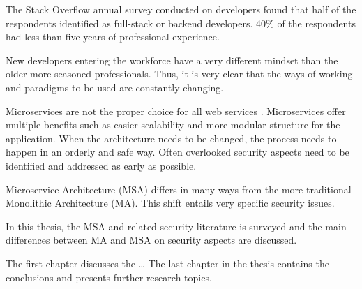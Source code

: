 \begin{sloppypar}
    The Stack Overflow annual survey \citep{sosurvey2019} conducted on 
    developers found that half of the respondents identified as full-stack or 
    backend developers. 40\% of the respondents had less than five years of 
    professional experience.
\end{sloppypar}
\begin{sloppypar}
    New developers entering the workforce have a very different mindset than 
    the older more seasoned professionals. Thus, it is very clear that the ways 
    of working and paradigms to be used are constantly changing.
\end{sloppypar}
\begin{sloppypar}
     Microservices are not the proper choice for all web services 
     \citep{newman2019}. Microservices offer multiple benefits such as easier 
     scalability and more modular structure for the application. When the 
     architecture needs to be changed, the process needs to happen in an orderly 
     and safe way. Often overlooked security aspects need to be identified and 
     addressed as early as possible.
\end{sloppypar}
\begin{sloppypar}
    Microservice Architecture (MSA) differs in many ways from 
    the more traditional Monolithic Architecture (MA). This shift entails very 
    specific security issues.
\end{sloppypar}
\begin{sloppypar}
    In this thesis, the MSA and related security literature is surveyed and the 
    main differences between MA and MSA on security aspects are discussed. 
\end{sloppypar}
\begin{sloppypar}
    The first chapter discusses the \dots
    The last chapter in the thesis contains the conclusions and presents further 
    research topics.
\end{sloppypar}




